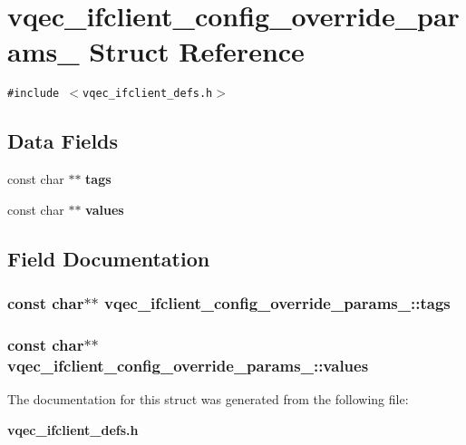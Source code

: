 \section{vqec\_\-ifclient\_\-config\_\-override\_\-params\_\- Struct Reference}
\label{structvqec__ifclient__config__override__params__}
{\tt \#include $<$vqec\_\-ifclient\_\-defs.h$>$}

\subsection*{Data Fields}
\begin{CompactItemize}
\item 
const char $\ast$$\ast$ \bf{tags}
\item 
const char $\ast$$\ast$ \bf{values}
\end{CompactItemize}


\subsection{Field Documentation}
\subsubsection{\setlength{\rightskip}{0pt plus 5cm}const char$\ast$$\ast$ \bf{vqec\_\-ifclient\_\-config\_\-override\_\-params\_\-::tags}}\label{structvqec__ifclient__config__override__params___b7b2c857d134a67fef3d2a3577d4a8f2}


\subsubsection{\setlength{\rightskip}{0pt plus 5cm}const char$\ast$$\ast$ \bf{vqec\_\-ifclient\_\-config\_\-override\_\-params\_\-::values}}\label{structvqec__ifclient__config__override__params___81a10819e23804c2234ff72167c73908}




The documentation for this struct was generated from the following file:\begin{CompactItemize}
\item 
\bf{vqec\_\-ifclient\_\-defs.h}\end{CompactItemize}
